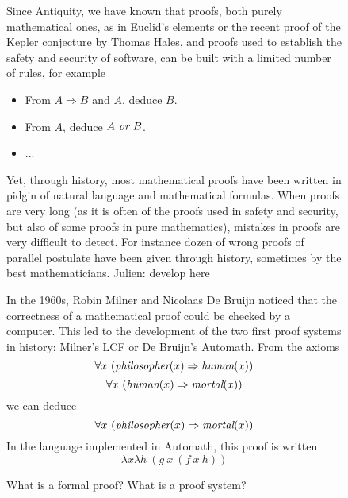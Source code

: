 \begin{figure}
\begin{framed}
Since Antiquity, we have known that
proofs, both purely mathematical ones, as in Euclid's elements or the
recent proof of the Kepler conjecture by Thomas Hales, and proofs used
to establish the safety and security of software, can be built with a
limited number of rules, for example
\begin{itemize}
\item From $A \Rightarrow B$ and $A$, deduce $B$.
\item From $A$, deduce $A~\mbox{\it or}~B$.
\item ...
\end{itemize}
Yet, through history, most mathematical proofs have been written in
pidgin of natural language and mathematical formulas. When proofs are
very long (as it is often of the proofs used in safety and security,
but also of some proofs in pure mathematics), mistakes in proofs are
very difficult to detect. For instance dozen of wrong proofs of
parallel postulate have been given through history, sometimes by the
best mathematicians. {\color{red} Julien: develop here}

In the 1960s, Robin Milner and Nicolaas De Bruijn noticed that the
correctness of a mathematical proof could be checked by a
computer. This led to the development of the two first proof systems
in history: Milner's {\sf LCF} or De Bruijn's {\sf Automath}.  From
the axioms
$$\forall x~(\mbox{\em philosopher}(x) \Rightarrow \mbox{\em human}(x))$$
$$\forall x~(\mbox{\em human}(x) \Rightarrow \mbox{\em mortal}(x))$$
we can deduce
$$\forall x~(\mbox{\em philosopher}(x) \Rightarrow \mbox{\em mortal}(x))$$
In the language implemented in {\sf Automath}, this proof is written
$$\lambda x \lambda h~(g~x~(f~x~h))$$

\caption{What is a formal proof? What is a proof system?\label{formal}}
\end{framed}
\end{figure}

